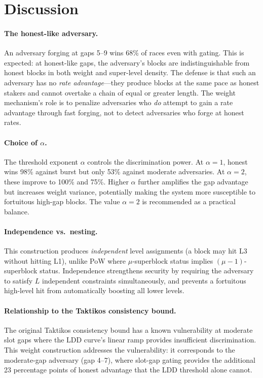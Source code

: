 \documentclass[11pt]{article}
\begin{document}
\section{Discussion}

\paragraph{The honest-like adversary.} An adversary forging at gaps 5--9 wins 68\% of races even with gating. This is expected: at honest-like gaps, the adversary's blocks are indistinguishable from honest blocks in both weight and super-level density. The defense is that such an adversary has no \emph{rate advantage}---they produce blocks at the same pace as honest stakers and cannot overtake a chain of equal or greater length. The weight mechanism's role is to penalize adversaries who \emph{do} attempt to gain a rate advantage through fast forging, not to detect adversaries who forge at honest rates.

\paragraph{Choice of $\alpha$.} The threshold exponent $\alpha$ controls the discrimination power. At $\alpha = 1$, honest wins 98\% against burst but only 53\% against moderate adversaries. At $\alpha = 2$, these improve to 100\% and 75\%. Higher $\alpha$ further amplifies the gap advantage but increases weight variance, potentially making the system more susceptible to fortuitous high-gap blocks. The value $\alpha = 2$ is recommended as a practical balance.

\paragraph{Independence vs.\ nesting.} This construction produces \emph{independent} level assignments (a block may hit L3 without hitting L1), unlike PoW where $\mu$-superblock status implies $(\mu-1)$-superblock status. Independence strengthens security by requiring the adversary to satisfy $L$ independent constraints simultaneously, and prevents a fortuitous high-level hit from automatically boosting all lower levels.

\paragraph{Relationship to the Taktikos consistency bound.} The original Taktikos consistency bound has a known vulnerability at moderate slot gaps where the LDD curve's linear ramp provides insufficient discrimination. This weight construction addresses the vulnerability: it corresponds to the moderate-gap adversary (gap 4--7), where slot-gap gating provides the additional 23 percentage points of honest advantage that the LDD threshold alone cannot.
\end{document}
